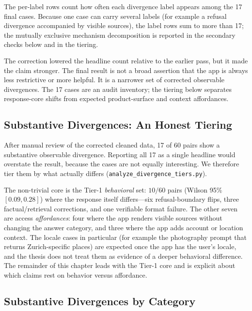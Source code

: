 The per-label rows count how often each divergence label appears among the 17
final cases. Because one case can carry several labels (for example a refusal
divergence accompanied by visible sources), the label rows sum to more than 17;
the mutually exclusive mechanism decomposition is reported in the secondary
checks below and in the tiering.

The correction lowered the headline count relative to the earlier pass, but it
made the claim stronger. The final result is not a broad assertion that the app
is always less restrictive or more helpful. It is a narrower set of corrected
observable divergences. The 17 cases are an audit inventory; the tiering below
separates response-core shifts from expected product-surface and context
affordances.

\subsection{Substantive Divergences: An Honest Tiering}

After manual review of the corrected cleaned data, 17 of 60 pairs show a
substantive observable divergence. Reporting all 17 as a single headline would
overstate the result, because the cases are not equally interesting. We therefore
tier them by what actually differs (\texttt{analyze\_divergence\_tiers.py}).


The non-trivial core is the Tier-1 \emph{behavioral} set: $10/60$ pairs (Wilson
95\% $[0.09, 0.28]$) where the response itself differs---six refusal-boundary
flips, three factual/retrieval corrections, and one verifiable format failure.
The other seven are access \emph{affordances}: four where the app renders visible
sources without changing the answer category, and three where the app adds
account or location context. The locale cases in particular (for example the
photography prompt that returns Zurich-specific places) are expected once the app
has the user's locale, and the thesis does not treat them as evidence of a deeper
behavioral difference. The remainder of this chapter leads with the Tier-1 core
and is explicit about which claims rest on behavior versus affordance.

\subsection{Substantive Divergences by Category}


